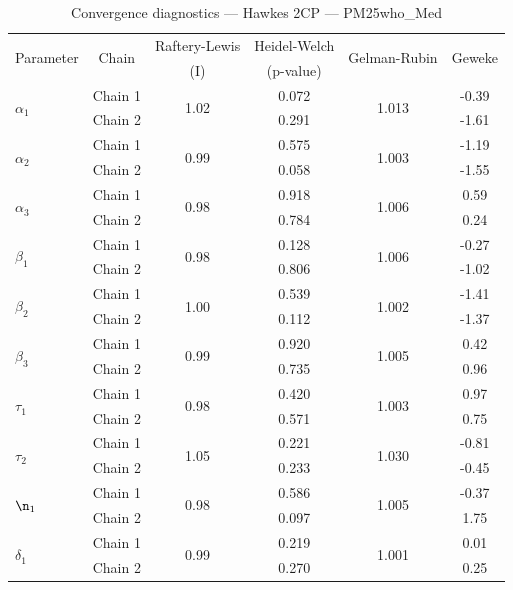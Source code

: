 \begin{table}[H]
\centering
\caption{Convergence diagnostics — Hawkes 2CP — PM25who_Med}
\begin{tabular}{lccccc}
\toprule
\multirow{2}{*}{Parameter} & \multirow{2}{*}{Chain} & Raftery-Lewis & Heidel-Welch & \multirow{2}{*}{Gelman-Rubin} & \multirow{2}{*}{Geweke} \\
 & & (I) & (p-value) & & (z) \\
\midrule
\multirow{2}{*}{$\alpha_1$} & Chain 1 & \multirow{2}{*}{1.02} & 0.072 & \multirow{2}{*}{1.013} & -0.39 \\
 & Chain 2 & & 0.291 & & -1.61 \\
\multirow{2}{*}{$\alpha_2$} & Chain 1 & \multirow{2}{*}{0.99} & 0.575 & \multirow{2}{*}{1.003} & -1.19 \\
 & Chain 2 & & 0.058 & & -1.55 \\
\multirow{2}{*}{$\alpha_3$} & Chain 1 & \multirow{2}{*}{0.98} & 0.918 & \multirow{2}{*}{1.006} & 0.59 \\
 & Chain 2 & & 0.784 & & 0.24 \\
\midrule
\multirow{2}{*}{$\beta_1$} & Chain 1 & \multirow{2}{*}{0.98} & 0.128 & \multirow{2}{*}{1.006} & -0.27 \\
 & Chain 2 & & 0.806 & & -1.02 \\
\multirow{2}{*}{$\beta_2$} & Chain 1 & \multirow{2}{*}{1.00} & 0.539 & \multirow{2}{*}{1.002} & -1.41 \\
 & Chain 2 & & 0.112 & & -1.37 \\
\multirow{2}{*}{$\beta_3$} & Chain 1 & \multirow{2}{*}{0.99} & 0.920 & \multirow{2}{*}{1.005} & 0.42 \\
 & Chain 2 & & 0.735 & & 0.96 \\
\midrule
\multirow{2}{*}{$\tau_1$} & Chain 1 & \multirow{2}{*}{0.98} & 0.420 & \multirow{2}{*}{1.003} & 0.97 \\
 & Chain 2 & & 0.571 & & 0.75 \\
\multirow{2}{*}{$\tau_2$} & Chain 1 & \multirow{2}{*}{1.05} & 0.221 & \multirow{2}{*}{1.030} & -0.81 \\
 & Chain 2 & & 0.233 & & -0.45 \\
\midrule
\multirow{2}{*}{$\n_1$} & Chain 1 & \multirow{2}{*}{0.98} & 0.586 & \multirow{2}{*}{1.005} & -0.37 \\
 & Chain 2 & & 0.097 & & 1.75 \\
\midrule
\multirow{2}{*}{$\delta_1$} & Chain 1 & \multirow{2}{*}{0.99} & 0.219 & \multirow{2}{*}{1.001} & 0.01 \\
 & Chain 2 & & 0.270 & & 0.25 \\
\bottomrule
\end{tabular}
\end{table}
